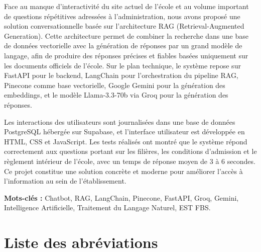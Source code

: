 \documentclass[12pt, a4paper, twoside]{report}
\begin{document}
Face au manque d'interactivité du site actuel de l'école et au volume important de questions répétitives adressées à l'administration, nous avons proposé une solution conversationnelle basée sur l'architecture RAG (Retrieval-Augmented Generation). Cette architecture permet de combiner la recherche dans une base de données vectorielle avec la génération de réponses par un grand modèle de langage, afin de produire des réponses précises et fiables basées uniquement sur les documents officiels de l'école. Sur le plan technique, le système repose sur FastAPI pour le backend, LangChain pour l'orchestration du pipeline RAG, Pinecone comme base vectorielle, Google Gemini pour la génération des embeddings, et le modèle Llama-3.3-70b via Groq pour la génération des réponses.

Les interactions des utilisateurs sont journalisées dans une base de données PostgreSQL hébergée sur Supabase, et l'interface utilisateur est développée en HTML, CSS et JavaScript. 
Les tests réalisés ont montré que le système répond correctement aux questions portant sur les filières, les conditions d'admission et le règlement intérieur de l'école, avec un temps de réponse moyen de 3 à 6 secondes. Ce projet constitue une solution concrète et moderne pour améliorer l'accès à l'information au sein de l'établissement.

\textbf{Mots-clés :} Chatbot, RAG, LangChain, Pinecone, FastAPI, Groq, Gemini, Intelligence Artificielle, Traitement du Langage Naturel, EST FBS.



\newpage
\chapter*{Liste des abréviations}
\end{document}
